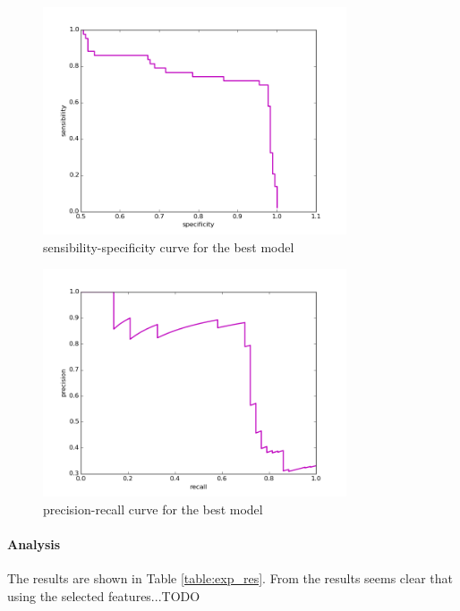\begin{figure}[h]
	\centering
	\includegraphics[width= 0.8\textwidth]{chapter4/sensibility_specificity.png}
	\caption{sensibility-specificity curve for the best model}
	\label{fig:sensibility_specificity_best}
\end{figure}

\begin{figure}[h]
	\centering
	\includegraphics[width= 0.8\textwidth]{chapter4/precision_recall.png}
	\caption{precision-recall curve for the best model}
	\label{fig:precision_recall_best}
\end{figure}

\paragraph{Analysis}
The results are shown in Table \ref{table:exp_res}.
From the results seems clear that using the selected features...TODO
